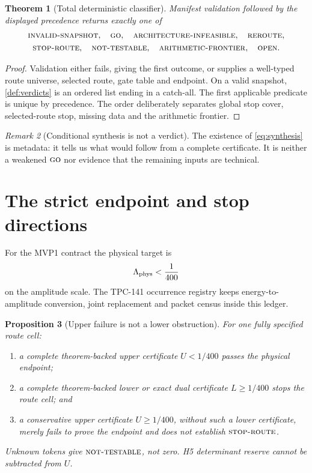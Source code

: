 \documentclass[11pt]{article}
\newtheorem{theorem}{Theorem}[section]
\newtheorem{proposition}[theorem]{Proposition}
\theoremstyle{definition}
\theoremstyle{remark}
\newtheorem{remark}[theorem]{Remark}
\newcommand{\GO}{\textnormal{\textsc{go}}}
\newcommand{\AINF}{\textnormal{\textsc{architecture-infeasible}}}
\newcommand{\REROUTE}{\textnormal{\textsc{reroute}}}
\newcommand{\STOPR}{\textnormal{\textsc{stop-route}}}
\newcommand{\NT}{\textnormal{\textsc{not-testable}}}
\newcommand{\AF}{\textnormal{\textsc{arithmetic-frontier}}}
\newcommand{\OPEN}{\textnormal{\textsc{open}}}
\newcommand{\INVALID}{\textnormal{\textsc{invalid-snapshot}}}
\begin{document}
\begin{theorem}[Total deterministic classifier]
\label{thm:classifier}
Manifest validation followed by the displayed precedence returns
exactly one of
\[
\begin{gathered}
\INVALID,\quad \GO,\quad \AINF,\quad \REROUTE,\\
\STOPR,\quad \NT,\quad \AF,\quad \OPEN.
\end{gathered}
\]
\end{theorem}

\begin{proof}
Validation either fails, giving the first outcome, or supplies a
well-typed route universe, selected route, gate table and endpoint.
On a valid snapshot, \cref{def:verdicts} is an ordered list ending in
a catch-all.  The first applicable predicate is unique by precedence.
The order deliberately separates global stop cover, selected-route
stop, missing data and the arithmetic frontier.
\end{proof}

\begin{remark}[Conditional synthesis is not a verdict]
The existence of \eqref{eq:synthesis} is metadata: it tells us what
would follow from a complete certificate.  It is neither a weakened
\(\GO\) nor evidence that the remaining inputs are technical.
\end{remark}

\section{The strict endpoint and stop directions}

For the MVP1 contract the physical target is
\[
 \Lambda_{\rm phys}<\frac1{400}
\]
on the amplitude scale.  The TPC-141 occurrence registry keeps
energy-to-amplitude conversion, joint replacement and packet census
inside this ledger.

\begin{proposition}[Upper failure is not a lower obstruction]
\label{prop:directions}
For one fully specified route cell:
\begin{enumerate}[label=(\alph*),leftmargin=2em]
\item a complete theorem-backed upper certificate
  \(U<1/400\) passes the physical endpoint;
\item a complete theorem-backed lower or exact dual certificate
  \(L\ge1/400\) stops the route cell; and
\item a conservative upper certificate \(U\ge1/400\), without such a
  lower certificate, merely fails to prove the endpoint and does not
  establish \(\STOPR\).
\end{enumerate}
Unknown tokens give \(\NT\), not zero.  H5 determinant reserve cannot
be subtracted from \(U\).
\end{proposition}
\end{document}
